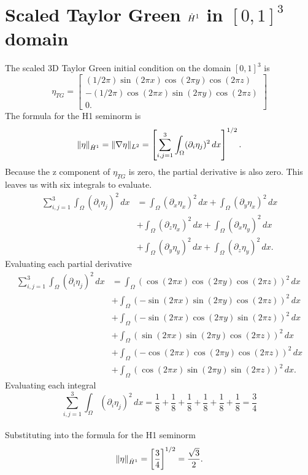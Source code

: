 \chapter{Scaled Taylor Green $\dot{H}^1$ in $[0,1]^3$ domain}
\label{app:tg:seminorm:1:scaled}

The scaled 3D Taylor Green initial condition on the domain $[0,1]^3$ is
$$\eta_{TG} = \begin{bmatrix}
           (1/2\pi)\sin(2\pi x)\cos(2\pi y)\cos(2\pi z) \\
           -(1/2\pi)\cos(2\pi x)\sin(2\pi y)\cos(2\pi z) \\
           0.
         \end{bmatrix}$$
The formula for the H1 seminorm is
$$\|\eta\|_{\dot{H}^1} = \|\nabla\eta\|_{L^2} = \left[ \sum_{i,j=1}^3 \int_{\Omega} (\partial_i\eta_j)^2 \,dx \right]^{1/2}.$$
Because the z component of $\eta_{TG}$ is zero, the partial derivative is also zero. This leaves us with six integrals to evaluate.
\begin{align*}
\sum_{i,j=1}^3 \int_{\Omega} (\partial_i\eta_j)^2 \,dx &= \int_{\Omega} (\partial_x\eta_x)^2 \, dx + \int_{\Omega} (\partial_y\eta_x)^2 \, dx \\
&+ \int_{\Omega} (\partial_z\eta_x)^2 \, dx + \int_{\Omega} (\partial_x\eta_y)^2 \, dx \\ 
&+ \int_{\Omega} (\partial_y\eta_y)^2 \, dx + \int_{\Omega} (\partial_z\eta_y)^2 \, dx.
\end{align*}
Evaluating each partial derivative
\begin{align*}
\sum_{i,j=1}^3 \int_{\Omega} (\partial_i\eta_j)^2 \,dx &= \int_{\Omega} (\cos(2\pi x)\cos(2\pi y)\cos(2\pi z))^2 \, dx \\ &+ \int_{\Omega} (-\sin(2\pi x)\sin(2\pi y)\cos(2\pi z))^2 \, dx \\
&+ \int_{\Omega} (-\sin(2\pi x)\cos(2\pi y)\sin(2\pi z))^2 \, dx \\ &+ \int_{\Omega} (\sin(2\pi x)\sin(2\pi y)\cos(2\pi z))^2 \, dx \\ 
&+ \int_{\Omega} (-\cos(2\pi x)\cos(2\pi y)\cos(2\pi z))^2 \, dx \\ &+ \int_{\Omega} (\cos(2\pi x)\sin(2\pi y)\sin(2\pi z))^2 \, dx.
\end{align*}
Evaluating each integral
$$\sum_{i,j=1}^3 \int_{\Omega} (\partial_i\eta_j)^2 \,dx = \frac{1}{8} + \frac{1}{8} + \frac{1}{8} + \frac{1}{8} + \frac{1}{8} + \frac{1}{8} = \frac{3}{4}$$
\\
Substituting into the formula for the H1 seminorm
\\
$$\|\eta\|_{\dot{H}^1} = \left[ \frac{3}{4} \right]^{1/2} = \frac{\sqrt{3}}{2}.$$